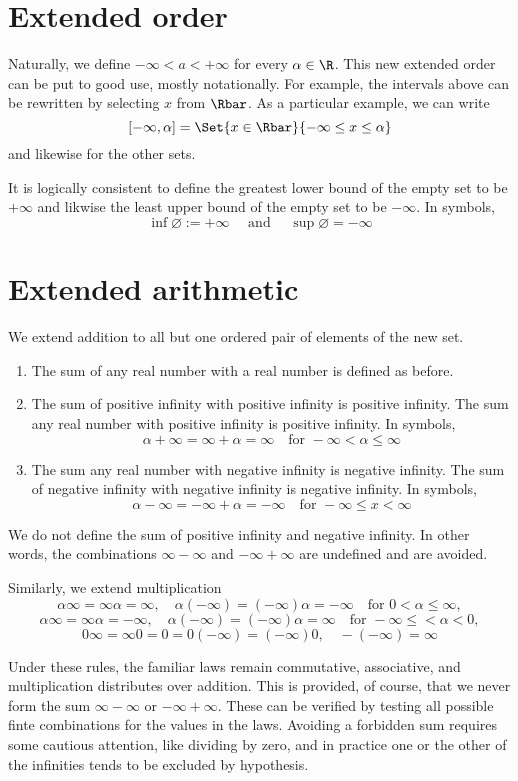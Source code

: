   \section*{Extended order}

Naturally, we define $-\infty < a < +\infty$ for every $\alpha \in \R $.
This new extended order can be put to good use, mostly notationally.
For example, the intervals above can be rewritten by selecting $x$ from $\Rbar$.
As a particular example, we can write
\[
[-\infty, \alpha ] =\Set{x \in \Rbar}{-\infty \leq x \leq \alpha }
\]
and likewise for the other sets.

It is logically consistent to define the greatest lower bound of the empty set to be $+\infty$ and likwise the least upper bound of the empty set to be $-\infty$.
In symbols,
\[
\inf \varnothing := +\infty \quad \text{ and } \quad \sup \varnothing = -\infty
\]

  \section*{Extended arithmetic}

We extend addition to all but one ordered pair of elements of the new set.
    \begin{enumerate}
      \item The sum of any real number with a real number is defined as before.
      \item The sum of positive infinity with positive infinity is positive infinity.
The sum any real number with positive infinity is positive infinity.
In symbols,
\[
\alpha  + \infty = \infty + \alpha  = \infty \quad \text{for } -\infty < \alpha  \leq \infty
\]
      \item The sum any real number with negative infinity is negative infinity.
The sum of negative infinity with negative infinity is negative infinity.
In symbols,
\[
\alpha  - \infty = -\infty + \alpha  = -\infty \quad \text{for } -\infty \leq x < \infty
\]
    \end{enumerate}
We do not define the sum of positive infinity and negative infinity.
In other words, the combinations $\infty - \infty$ and $-\infty + \infty$ are undefined and are avoided.

Similarly, we extend multiplication
\[
\alpha \infty = \infty\alpha  = \infty, \quad \alpha (-\infty) = (-\infty)\alpha  = -\infty \quad \text{for } 0 < \alpha  \leq \infty,
\]
\[
\alpha \infty = \infty\alpha  = -\infty, \quad \alpha (-\infty) = (-\infty)\alpha  = \infty \quad \text{for } -\infty \leq < \alpha  < 0,
\]
\[
0\infty = \infty0 = 0 = 0(-\infty) = (-\infty)0, \quad -(-\infty) = \infty
\]

Under these rules, the familiar laws remain commutative, associative, and multiplication distributes over addition.
This is provided, of course, that we never form the sum $\infty - \infty$ or $-\infty + \infty$.
These can be verified by testing all possible finte combinations for the values in the laws.
Avoiding a forbidden sum requires some cautious attention, like dividing by zero, and in practice one or the other of the infinities tends to be excluded by hypothesis.

\blankpage
